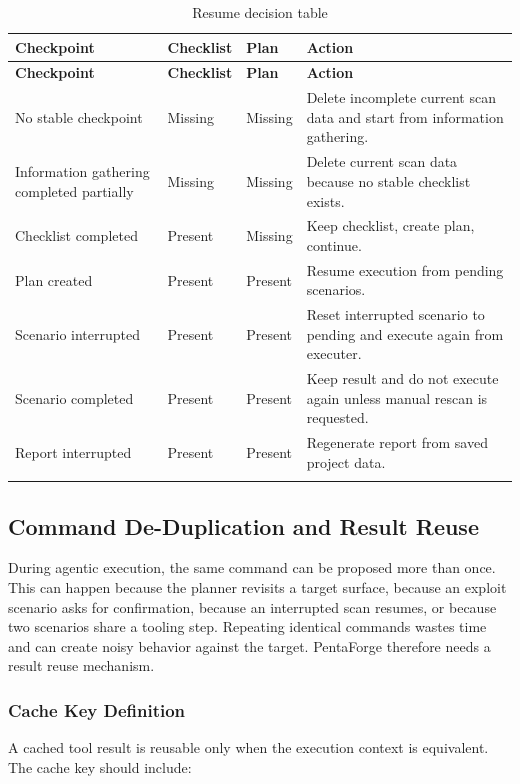 \documentclass[12pt,a4paper]{report}
\begin{document}
\begin{longtable}{|p{}|p{}|p{}|p{}|}
\hline
\textbf{Checkpoint} & \textbf{Checklist} & \textbf{Plan} & \textbf{Action} \\
\hline
\endfirsthead
\hline
\textbf{Checkpoint} & \textbf{Checklist} & \textbf{Plan} & \textbf{Action} \\
\hline
\endhead
No stable checkpoint & Missing & Missing & Delete incomplete current scan data and
start from information gathering. \\
\hline
Information gathering completed partially & Missing & Missing & Delete current scan
data because no stable checklist exists. \\
\hline
Checklist completed & Present & Missing & Keep checklist, create plan, continue. \\
\hline
Plan created & Present & Present & Resume execution from pending scenarios. \\
\hline
Scenario interrupted & Present & Present & Reset interrupted scenario to pending and
execute again from executer. \\
\hline
Scenario completed & Present & Present & Keep result and do not execute again unless
manual rescan is requested. \\
\hline
Report interrupted & Present & Present & Regenerate report from saved project data. \\
\hline
\caption{Resume decision table}
\label{tab:resume_decision_table}
\end{longtable}

\subsection{Command De-Duplication and Result Reuse}

During agentic execution, the same command can be proposed more than once. This can
happen because the planner revisits a target surface, because an exploit scenario asks
for confirmation, because an interrupted scan resumes, or because two scenarios share a
tooling step. Repeating identical commands wastes time and can create noisy behavior
against the target. PentaForge therefore needs a result reuse mechanism.

\subsubsection{Cache Key Definition}

A cached tool result is reusable only when the execution context is equivalent. The
cache key should include:
\end{document}
